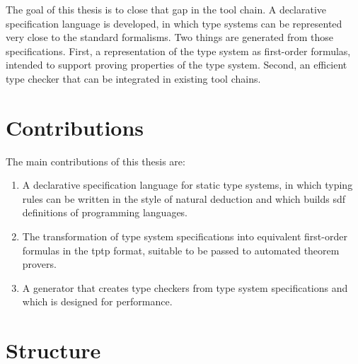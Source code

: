 The goal of this thesis is to close that gap in the tool chain. A
declarative specification language is developed, in which type systems
can be represented very close to the standard formalisms. Two things
are generated from those specifications. First, a representation of
the type system as first-order formulas, intended to support proving
properties of the type system. Second, an efficient type checker that
can be integrated in existing tool chains.
\section{Contributions}
The main contributions of this thesis are:
\begin{enumerate}
\item A declarative specification language for static type systems, in
  which typing rules can be written in the style of natural deduction
  and which builds \gls{sdf} definitions of programming languages.
\item The transformation of type system specifications into equivalent
  first-order formulas in the \gls{tptp} format, suitable to be passed to
  automated theorem provers.
\item A generator that creates type checkers from type system
  specifications and which is designed for performance.
\end{enumerate}

\section{Structure}

